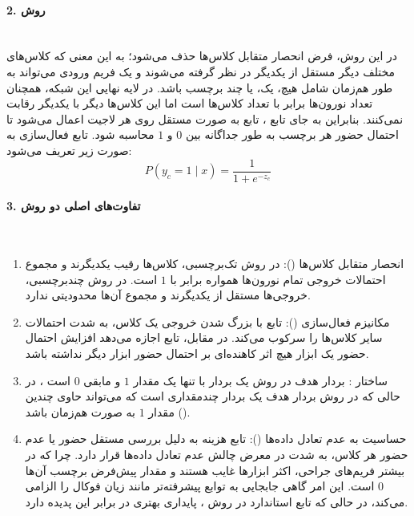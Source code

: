 \documentclass{article}
\begin{document}
\paragraph{2. روش }\mbox{}\\
در این روش، فرض انحصار متقابل کلاس‌ها حذف می‌شود؛ به این معنی که کلاس‌های مختلف دیگر مستقل از یکدیگر در نظر گرفته می‌شوند و یک فریم ورودی می‌تواند به طور هم‌زمان شامل هیچ، یک، یا چند برچسب باشد. در لایه نهایی این شبکه، همچنان تعداد نورون‌ها برابر با تعداد کلاس‌ها است اما این کلاس‌ها دیگر با یکدیگر رقابت نمی‌کنند. بنابراین به جای تابع ، تابع  به صورت مستقل روی هر لاجیت اعمال می‌شود تا احتمال حضور هر برچسب به طور جداگانه بین $0$ و $1$ محاسبه شود. تابع فعال‌سازی  به صورت زیر تعریف می‌شود:
$$ P(y_c = 1 \mid x) = \frac{1}{1 + e^{-z_c}} $$

\paragraph{3. تفاوت‌های اصلی دو روش}\mbox{}\\
\begin{enumerate}
\item انحصار متقابل کلاس‌ها (): در روش تک‌برچسبی، کلاس‌ها رقیب یکدیگرند و مجموع احتمالات خروجی تمام نورون‌ها همواره برابر با $1$ است. در روش چندبرچسبی، خروجی‌ها مستقل از یکدیگرند و مجموع آن‌ها محدودیتی ندارد.

\item مکانیزم فعال‌سازی (): تابع  با بزرگ شدن خروجی یک کلاس، به شدت احتمالات سایر کلاس‌ها را سرکوب می‌کند. در مقابل، تابع  اجازه می‌دهد افزایش احتمال حضور یک ابزار هیچ اثر کاهنده‌ای بر احتمال حضور ابزار دیگر نداشته باشد.

\item ساختار : بردار هدف در روش  یک بردار با تنها یک مقدار $1$ و مابقی $0$ است ، در حالی که در روش  بردار هدف یک بردار چند‌مقداری است که می‌تواند حاوی چندین مقدار $1$ به صورت هم‌زمان باشد ().

\item حساسیت به عدم تعادل داده‌ها ():
 تابع هزینه  به دلیل بررسی مستقل حضور یا عدم حضور هر کلاس، به شدت در معرض چالش عدم تعادل داده‌ها قرار دارد. چرا که در بیشتر فریم‌های جراحی، اکثر ابزارها غایب هستند و مقدار پیش‌فرض برچسب آن‌ها $0$ است. این امر گاهی جابجایی به توابع پیشرفته‌تر مانند زیان فوکال  را الزامی می‌کند، در حالی که تابع استاندارد در روش ، پایداری بهتری در برابر این پدیده دارد.
\end{enumerate}
\end{document}
